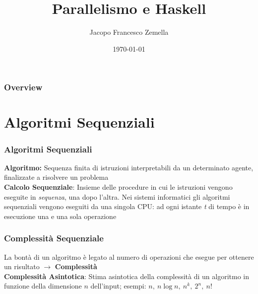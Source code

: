 \documentclass[14pt]{beamer}
\title[Parallelismo e Haskell]{Parallelismo e Haskell} %
\author{Jacopo Francesco Zemella} %
\institute[Unimi] %
{
Universit\`a degli studi di Milano \\ %
\medskip
\textit{jacopofrancesco.zemella@studenti.unimi.it} %
}
\date{\today} %
\begin{document}
\begin{frame}
\titlepage %
\end{frame}

\begin{frame}
\frametitle{Overview} %
\tableofcontents %
\end{frame}


\section{Algoritmi Sequenziali} %


\begin{frame}
\frametitle{Algoritmi Sequenziali}
\textbf{Algoritmo:} Sequenza finita di istruzioni interpretabili da un determinato agente, finalizzate a risolvere un problema\\
\textbf{Calcolo Sequenziale}: Insieme delle procedure in cui le istruzioni vengono eseguite in \textit{sequenza}, una dopo l'altra. Nei sistemi informatici gli algoritmi sequenziali vengono eseguiti da una singola CPU: ad ogni istante \textit{t} di tempo è in esecuzione una e una sola operazione
\end{frame}


\begin{frame}
\frametitle{Complessità Sequenziale}
La bontà di un algoritmo è legato al numero di operazioni che esegue per ottenere un risultato $\rightarrow$ \textbf{Complessità}\\
\textbf{Complessità Asintotica}: Stima asintotica della complessità di un algoritmo in funzione della dimensione $n$ dell'input; esempi: $n, \ n\log n, \ n^k, \ 2^n, \ n!$
\end{frame}
\end{document}
